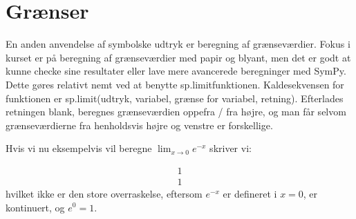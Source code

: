 \documentclass[letterpaper,10pt,english]{jupyterBook}
\begin{document}
\section{Grænser}
\label{\detokenize{notebooks/sympy/Notebook2_limits:graenser}}\label{\detokenize{notebooks/sympy/Notebook2_limits::doc}}
En anden anvendelse af symbolske udtryk er beregning af grænseværdier. Fokus i kurset er på beregning af grænseværdier med papir og blyant, men det er godt at kunne checke sine resultater eller lave mere avancerede beregninger med SymPy. Dette gøres relativt nemt ved at benytte sp.limit\sphinxhyphen{}funktionen. Kaldesekvensen for funktionen er
sp.limit(udtryk, variabel, grænse for variabel, retning). Efterlades retningen blank, beregnes grænseværdien oppefra / fra højre, og man får  selvom grænseværdierne fra henholdsvis højre og venstre er forskellige.

Hvis vi nu eksempelvis vil beregne \(\lim_{x\to 0} e^{-x}\) skriver vi:

\begin{sphinxVerbatim}[commandchars=\\\{\}]
               
          
             
\end{sphinxVerbatim}

\begin{sphinxVerbatim}[commandchars=\\\{\}]
                      
      
      
\end{sphinxVerbatim}
\begin{equation*}
\begin{split}\displaystyle 1\end{split}
\end{equation*}\begin{equation*}
\begin{split}\displaystyle 1\end{split}
\end{equation*}
hvilket ikke er den store overraskelse, eftersom \(e^{-x}\) er defineret i \(x=0\), er kontinuert, og \(e^0=1\).
\end{document}
